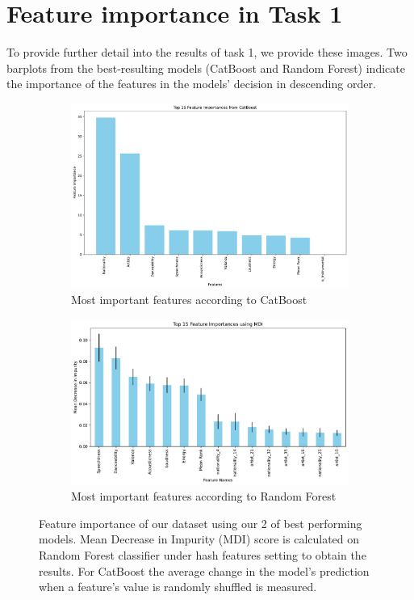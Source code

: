 \documentclass{article}
\begin{document}
\section{Feature importance in Task 1}

To provide further detail into the results of task 1, we provide these images. Two barplots from the best-resulting models (CatBoost and Random Forest) indicate the importance of the features in the models' decision in descending order.

\begin{figure}[h!]
    \centering
    \begin{subfigure}{0.45\textwidth}
        \centering
        \includegraphics[width=\textwidth]{catboost_importance.pdf}
        \caption{Most important features according to CatBoost}
        \label{fig:subfigure1}
    \end{subfigure}
    \hfill
    \begin{subfigure}{0.45\textwidth}
        \centering
        \includegraphics[width=\textwidth]{feature_importance_top15_hash.pdf}
        \caption{Most important features according to Random Forest}
        \label{fig:subfigure2}
    \end{subfigure}
    \caption{Feature importance of our dataset using our 2 of best performing models. Mean Decrease in Impurity (MDI) score is calculated on Random Forest classifier under hash features setting to obtain the results. For CatBoost the average change in the model's prediction when a feature's value is randomly shuffled is measured.}
    \label{fig:feature_importance}
\end{figure}
\end{document}
